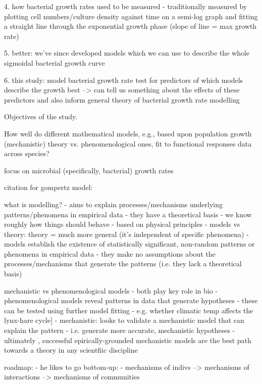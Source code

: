 \documentclass[11pt]{article}
\begin{document}
	4. how bacterial growth rates used to be measured
	- traditionally measured by plotting cell numbers/culture density against time on a semi-log graph and fitting a straight line through the exponential growth phase (slope of line = max growth rate)
	
	5. better: we've since developed models which we can use to describe the whole sigmoidal bacterial growth curve
	
	6. this study:
	model bacterial growth rate
	test for predictors of which models describe the growth best --> can tell us something about the effects of these predictors and also inform general theory of bacterial growth rate modelling
	

	
	
	
	
	
	Objectives of the study.
	
	
	How well do different mathematical models, e.g., based upon population growth (mechanistic) theory vs. phenomenological ones, fit to functional responses data across species?
	
	focus on microbial (specifically, bacterial) growth rates
	
	
	citation for gompertz model: \cite{gompertz1825xxiv}
	

	
	
	what is modelling?
	- aims to explain processes/mechanisms underlying patterns/phenomena in empirical data 
	- they have a theoretical basis - we know roughly how things should behave - based on physical principles
	- models vs theory: theory = much more general (it's independent of specific phenomena)
	- models establish the existence of statistically significant, non-random patterns or phenomena in empirical data
	- they make no assumptions about the processes/mechanisms that generate the patterns (i.e. they lack a theoretical basis)
	
	
	mechanistic vs phenomenological models
	- both play key role in bio
	- phenomenological models reveal patterns in data that generate hypotheses
	- these can be tested using further model fitting
	- e.g. whether climatic temp affects the lynx-hare cycle]
	- mechanistic: looks to validate a mechanistic model that can explain the pattern
	- i.e. generate more accurate, mechanistic hypotheses
	- ultimately , successful epirically-grounded mechanistic models are the best path towards a theory in any scientfiic discipline
	
	roadmap:
	- he likes to go bottom-up:
	- mechanisms of indivs --> mechanisms of interactions --> mechanisms of communities
	
\end{document}
